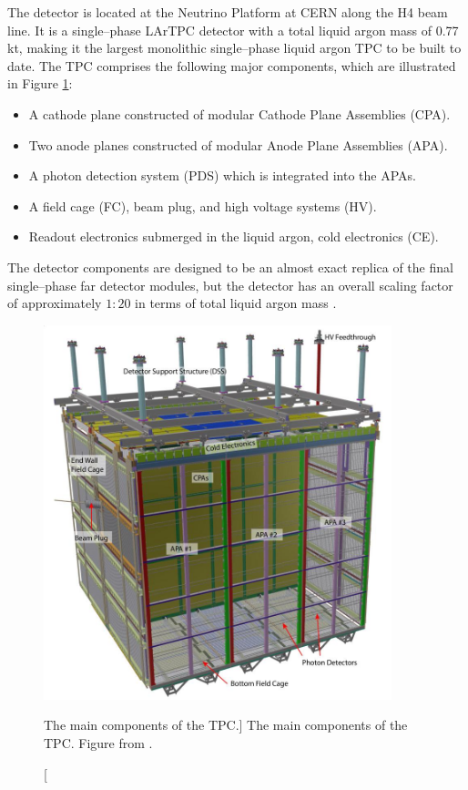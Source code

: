 The \protodune{} detector is located at the Neutrino Platform at CERN along the
H4 beam line. It is a single--phase LArTPC detector with a total liquid argon 
mass of 0.77 kt, making it the largest monolithic single--phase liquid argon TPC
to be built to date. The TPC comprises the following major components, which 
are illustrated in Figure \ref{fig:pdsp_tpc}:
\begin{itemize}
	\item A cathode plane constructed of modular Cathode Plane Assemblies (CPA).
	\item Two anode planes constructed of modular Anode Plane Assemblies (APA).
	\item A photon detection system (PDS) which is integrated into the APAs.
	\item A field cage (FC), beam plug, and high voltage systems (HV).
	\item Readout electronics submerged in the liquid argon, cold electronics 
		(CE). 
\end{itemize}
The detector components are designed to be an almost exact replica of the final 
single--phase far detector modules, but the detector has an overall scaling 
factor of approximately $1:20$ in terms of total liquid argon mass 
\cite{Abi2017}.

\begin{figure}

	\centering

	\includegraphics[width=0.9\textwidth]{figures/pdsp_tpc.jpg}

	\caption
	[The main components of the \protodune{} TPC.]
	{The main components of the \protodune{} TPC. Figure from \cite{Abi2017}.}

	\label{fig:pdsp_tpc}

\end{figure}

